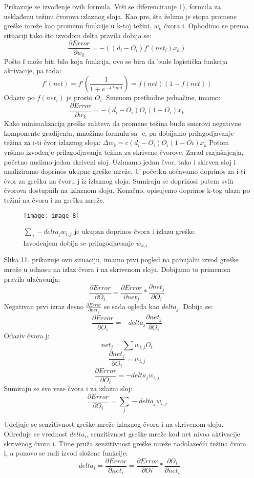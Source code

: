 \documentclass[fontsize=11bp, paper=a4]{scrarticle}
\begin{document}
Prikazuje se izvođenje ovih formula. Vrši se diferenciranje 1), formula za usklađenu težinu čvorova izlaznog sloja. Kao pre, šta želimo je stopa promene greške mreže kao promenu funkcije u k-toj težini, $w_k$ čvora i. Ophodimo se prema situaciji tako što izvodom delta pravila dobija se:
$$
\frac{\partial Error}{\partial w_k} = -((d_i - O_i)f'(net_i)x_k)
$$
Pošto f može biti bilo koja funkcija, ovo se bira da bude logistička funkcija aktivacije, pa tada:
$$
f'(net) = f'(\frac{1}{1+e^{-\lambda * net}}) = f(net)(1-f(net))
$$
Odaziv po $f(net_i)$ je prosto $O_i$. Smenom prethodne jednačine, imamo:
$$
\frac{\partial Error}{\partial w_k} = -(d_i - O_i)O_i(1-O_i)x_k
$$
Kako minimalizacija greške zahteva da promene težina budu smerovi negativne komponente gradijenta, množimo formulu sa -c, pa dobijamo prilagodjavanje težina za i-ti čvor izlaznog sloja: $\Delta w_k = c(d_i -O_i) O_i (1-Oi)x_k$
Potom vršimo izvođenje prilagodjavanja težina za skrivene čvorove. Zarad razjašnjenja, početno nudimo jedan skriveni sloj. Uzimamo jedan čvor, tako i skirven sloj i analiziramo doprinos ukupne greške mreže. U početku uočavamo doprinos za i-ti čvor za grešku na čvoru j iz izlaznog sloja. Sumiraju se doprinosi putem svih čvorova dostupnih na izlaznom sloju. Konačno, opisujemo doprinos k-tog ulaza po težini na čvoru i za grešku mreže. 

\begin{figure}[h!]
    \centering
    \texttt{[image: image-8]}
    \caption{$\sum_j - delta_j w_{i,j}$ je ukupan doprinos čvora i izlazu greške. Izvođenjem dobija se prilagodjavanje $w_{k,i}$}
\end{figure}

Slika 11. prikazuje ovu situaciju, imamo prvi pogled na parcijalni izvod greške mreže u odnosu na izlaz čvora i na skrivenom sloju. Dobijamo to primenom pravila ulačavanja:
$$
\frac{\partial Error}{\partial O_i} = \frac{\partial Error}{\partial net_j} * \frac{\partial net_j}{\partial O_i}
$$
Negativan prvi izraz desno $\frac{\partial Error}{\partial net_j}$ se sada ogleda kao $delta_j$. Dobija se:
$$
\frac{\partial Error}{\partial O_i} = - delta_j \frac{\partial net_j}{\partial O_i}
$$
Odaziv čvora j:
$$ 
net_j = \sum w_{i,j} O_i
$$
$$
\frac{\partial net_j}{\partial O_i} = w_{i,j}
$$
$$
\frac{\partial Error}{\partial O_i} = -delta_j w_{i,j}
$$
Sumiraju se sve veze čvora i za izlazni sloj:
$$
\frac{\partial Error}{\partial O_i} = \sum_j -delta_j w_{i,j}
$$

Udeljuje se senzitivnost greške mreže izlaznog čvora i na skrivenom sloju. Određuje se vrednost $delta_i$, senzitivnost greške mreže kod net nivoa aktivacije skrivenog čvora i. Time pruža senzitivnost greške mreže nadolazećih težina čvora i, a ponovo se radi izvod složene funkcije:
$$
-delta_i = \frac{\partial Error}{\partial net_i} = \frac{\partial Error}{\partial Oi} * \frac{\partial O_i}{\partial net_i}
$$
\end{document}
